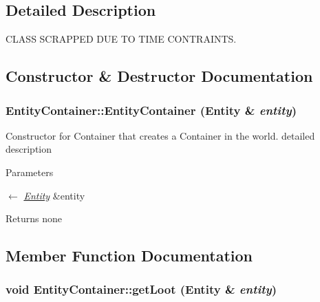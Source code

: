\subsection{Detailed Description}
CLASS SCRAPPED DUE TO TIME CONTRAINTS. 

\subsection{Constructor \& Destructor Documentation}
\hypertarget{classEntityContainer_a5ab518a81cab8bdd644461f7c2b8ce63}{
\subsubsection[{EntityContainer}]{\setlength{\rightskip}{0pt plus 5cm}EntityContainer::EntityContainer ({\bf Entity} \& {\em entity})}}
\label{classEntityContainer_a5ab518a81cab8bdd644461f7c2b8ce63}


Constructor for Container that creates a Container in the world. detailed description 
\begin{DoxyParams}{Parameters}
\item[\mbox{$\leftarrow$} {\em \hyperlink{classEntity}{Entity}}]\&entity \end{DoxyParams}
\begin{DoxyReturn}{Returns}
none 
\end{DoxyReturn}


\subsection{Member Function Documentation}
\hypertarget{classEntityContainer_aaff8158120180012c66c61bc9c89cc99}{
\subsubsection[{getLoot}]{\setlength{\rightskip}{0pt plus 5cm}void EntityContainer::getLoot ({\bf Entity} \& {\em entity})}}
\label{classEntityContainer_aaff8158120180012c66c61bc9c89cc99}


